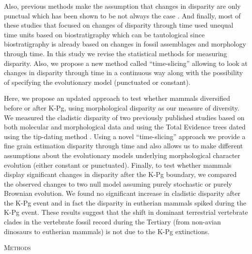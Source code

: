 \documentclass[12pt,letterpaper]{article}
\renewcommand{\section}[1]{%
\bigskip
\begin{center}
\begin{Large}
\normalfont\scshape #1
\medskip
\end{Large}
\end{center}}
\begin{document}
\begin{enumerate}
    Also, previous methods make the assumption that changes in disparity are only punctual \citep[e.g.][]{Wesley-Hunt2005} which has been shown to be not always the case \citep{Hunt21042015}.
    And finally, most of these studies that focused on changes of disparity through time used unequal time units based on biostratigraphy \citep{Brusatte12092008,brusattedinosaur2012,toljagictriassic-jurassic2013} which can be tautological since biostratigraphy is already based on changes in fossil assemblages and morphology through time.
    In this study we revise the statistical methods for measuring disparity.
    Also, we propose a new method called ``time-slicing'' allowing to look at changes in disparity through time in a continuous way along with the possibility of specifying the evolutionary model (punctuated or constant).
  \end{enumerate}

Here, we propose an updated approach to test whether mammals diversified before or after K-Pg, using morphological disparity as our measure of diversity.
We measured the cladistic disparity of two previously published studies \citep{Slater2012MEE,beckancient2014} based on both molecular and morphological data and using the Total Evidence trees dated using the tip-dating method \citep{ronquista2012,Wood01032013}.
Using a novel ``time-slicing'' approach we provide a fine grain estimation disparity through time and also allows us to make different assumptions about the evolutionary models underlying morphological character evolution (either constant or punctuated). 
Finally, to test whether mammals display significant changes in disparity after the K-Pg boundary, we compared the observed changes to two null model assuming purely stochastic or purely Brownian evolution. 
We found no significant increase in cladistic disparity after the K-Pg event and in fact the disparity in eutherian mammals spiked during the K-Pg event. 
These results suggest that the shift in dominant terrestrial vertebrate clades in the vertebrate fossil record during the Tertiary (from non-avian dinosaurs to eutherian mammals) is not due to the K-Pg extinctions.

%
%

\section{Methods}
\end{document}
